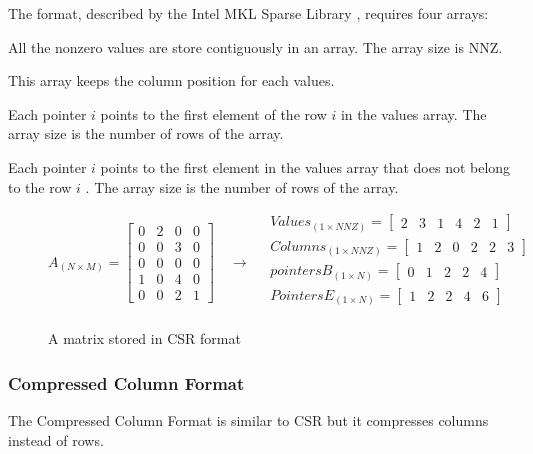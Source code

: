 The format, described by the Intel MKL Sparse Library \cite{mklformat}, requires four arrays:
\begin{description}[leftmargin=!,labelwidth=\widthof{\bfseries Beginning of row pointers}]
	\item [Values] All the nonzero values are store contiguously in an array. The array size is {NNZ}.
	\item [Column pointers] This array keeps the column position for each values.
	\item [Beginning of row pointers] Each pointer $i$ points to the first element of the row $i$ in the values array. The array size is the number of rows of the array.
	\item [End of row pointers]  Each pointer $i$ points to the first element in the values array that does not belong to the row $i$ . The array size is the number of rows of the array.
\end{description}

\begin{figure}
	\[
	A_{(N\times M)} = 
	\begin{bmatrix}
	0 & 2 & 0 & 0\\
	0 & 0 & 3 & 0\\
	0 & 0 & 0 & 0\\
	1 & 0 & 4 & 0\\
	0 & 0 & 2 & 1
	\end{bmatrix}
	\quad\rightarrow\quad
	\begin{aligned}
	Values_{(1\times NNZ)} = 
	\begin{bmatrix}
	2 &  3 & 1 & 4 & 2 & 1
	\end{bmatrix}
	\\
	Columns_{(1\times NNZ)} = 
	\begin{bmatrix}
	1 &  2 & 0 & 2 & 2 & 3
	\end{bmatrix}
	\\
	pointersB_{(1\times N)} = 
	\begin{bmatrix}
	0 & 1 & 2 & 2 & 4 
	\end{bmatrix}
	\\
	PointersE_{(1\times N)} = 
	\begin{bmatrix}
	1 & 2 & 2 & 4 & 6
	\end{bmatrix}
	\\
	\end{aligned}
	\]
	\caption{A matrix stored in CSR format}
		\label{fig:csrformat}
\end{figure}
\subsubsection{Compressed Column Format}
The Compressed Column Format is similar to {CSR} but it compresses columns instead of rows.

